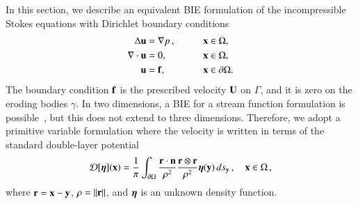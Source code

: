 \documentclass[preprint, 10pt]{elsarticle}
\begin{document}
In this section, we describe an equivalent BIE formulation of the incompressible Stokes equations with Dirichlet boundary conditions
\begin{equation}
  \begin{split}
  \Delta {\mathbf{u}} &= {\nabla} p\, , \qquad && {\mathbf{x}} \in \Omega, \\
  {\nabla} \cdot {\mathbf{u}} &= 0,   && {\mathbf{x}} \in \Omega, \\
  {\mathbf{u}} &= {\mathbf{f}},  && {\mathbf{x}} \in {\partial}\Omega.
  \end{split}
  \label{eqn:stokes}
\end{equation}
The boundary condition ${\mathbf{f}}$ is the prescribed velocity ${\mathbf{U}}$ on
$\Gamma$, and it is zero on the eroding bodies $\gamma$.  In two dimensions, a BIE for a stream function formulation is possible~\cite{gre-kro-may1996}, but this does not extend to three dimensions.  Therefore, we adopt a primitive variable formulation where the velocity is written in terms of the standard double-layer potential~\cite{lad1963,poz1992}
\begin{align}
  {\mathcal{D}}[{\boldsymbol\eta}]({\mathbf{x}}) = \frac{1}{\pi} \int_{{\partial}\Omega} 
    \frac{{\mathbf{r}} \cdot {\mathbf{n}}}{\rho^2} \frac{{\mathbf{r}} \otimes {\mathbf{r}}}{\rho^2} 
    {\boldsymbol\eta}({\mathbf{y}}) \, ds_{\mathbf{y}}\, , \quad {\mathbf{x}} \in \Omega \, ,
    \label{eqn:velocityDLP}
\end{align}
where ${\mathbf{r}} = {\mathbf{x}} - {\mathbf{y}}$, $\rho = \|{\mathbf{r}}\|$, and ${\boldsymbol\eta}$ is an unknown density function.  
\end{document}
